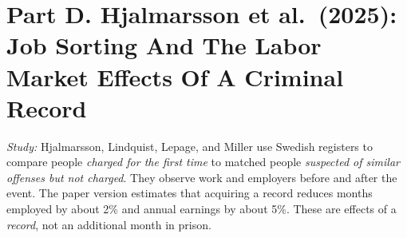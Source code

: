 \documentclass[11pt]{article}
\begin{document}
\newpage

\section*{Part D. Hjalmarsson et al.\ (2025): Job Sorting And The \mbox{Labor} Market Effects Of A Criminal Record}

\noindent\textit{Study:}
Hjalmarsson, Lindquist, Lepage, and Miller use Swedish registers
to compare people \emph{charged for the first time} to matched
people \emph{suspected of similar offenses but not charged}.
They observe work and employers before and after the event.
The paper version estimates that
acquiring a record reduces months employed by about 2\%
and annual earnings by about 5\%.
These are effects of a \emph{record}, not an additional month in prison.
\end{document}
